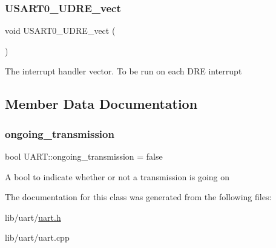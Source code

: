 \subsubsection{\texorpdfstring{U\+S\+A\+R\+T0\+\_\+\+U\+D\+R\+E\+\_\+vect}{USART0\_UDRE\_vect}}
{\footnotesize\ttfamily void U\+S\+A\+R\+T0\+\_\+\+U\+D\+R\+E\+\_\+vect (\begin{DoxyParamCaption}{ }\end{DoxyParamCaption})\hspace{0.3cm}{\ttfamily [friend]}}

The interrupt handler vector. To be run on each D\+RE interrupt 

\subsection{Member Data Documentation}
\hypertarget{class_u_a_r_t_ae98e7d277a1833478aa85dc9e686150a}{}\label{class_u_a_r_t_ae98e7d277a1833478aa85dc9e686150a} 
\subsubsection{\texorpdfstring{ongoing\+\_\+transmission}{ongoing\_transmission}}
{\footnotesize\ttfamily bool U\+A\+R\+T\+::ongoing\+\_\+transmission = false\hspace{0.3cm}{\ttfamily [private]}}

A bool to indicate whether or not a transmission is going on 

The documentation for this class was generated from the following files\+:\begin{DoxyCompactItemize}
\item 
lib/uart/\hyperlink{uart_8h}{uart.\+h}\item 
lib/uart/uart.\+cpp\end{DoxyCompactItemize}
